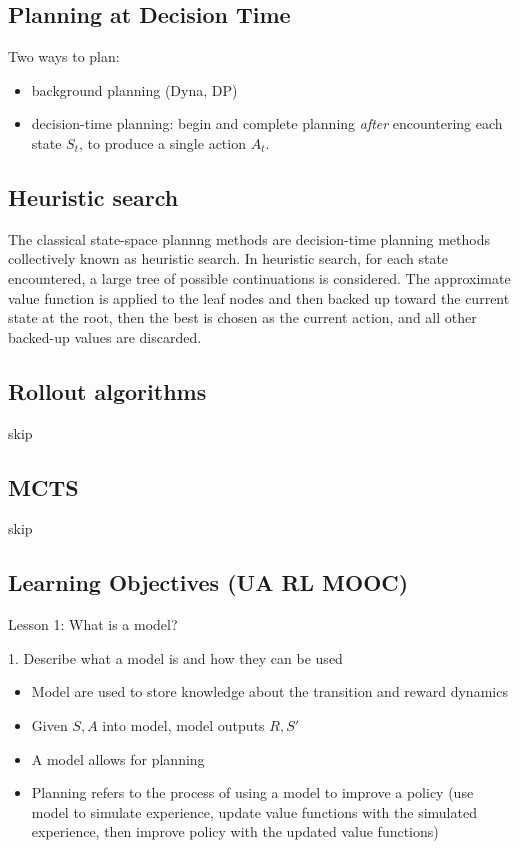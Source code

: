 \documentclass[sutton_barto_notes.tex]{subfiles}
\begin{document}
\subsection{Planning at Decision Time}
Two ways to plan:
\begin{itemize}
\item background planning (Dyna, DP)
\item decision-time planning: begin and complete planning \textit{after} encountering each state $S_t$, to produce a single action $A_t$.
\end{itemize}

\subsection{Heuristic search}

The classical state-space plannng methods are decision-time planning methods collectively known as heuristic search. In heuristic search, for each state encountered, a large tree of possible continuations is considered. The approximate value function is applied to the leaf nodes and then backed up toward the current state at the root, then the best is chosen as the current action, and all other backed-up values are discarded.

\subsection{Rollout algorithms}

skip

\subsection{MCTS}

skip


\subsection{Learning Objectives (UA RL MOOC)}


Lesson 1: What is a model? 

1. Describe what a model is and how they can be used

\begin{itemize}
\item Model are used to store knowledge about the transition and reward dynamics
\item Given $S,A$ into model, model outputs $R, S'$
\item A model allows for planning
\item Planning refers to the process of using a model to improve a policy (use model to simulate experience, update value functions with the simulated experience, then improve policy with the updated value functions)
\end{itemize}
\end{document}
